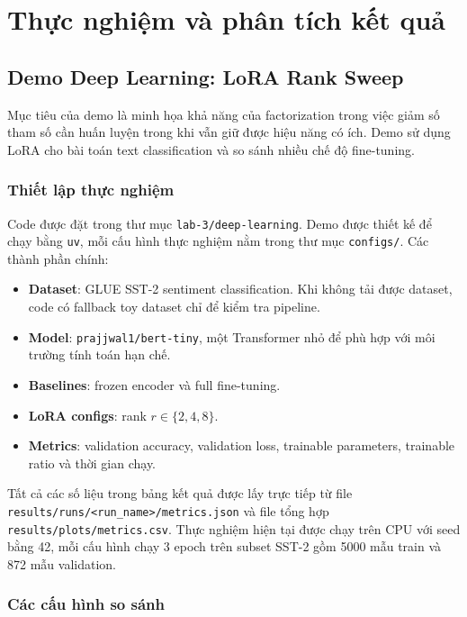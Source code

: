 \section{Thực nghiệm và phân tích kết quả}

\subsection{Demo Deep Learning: LoRA Rank Sweep}

Mục tiêu của demo là minh họa khả năng của factorization trong việc giảm số tham
số cần huấn luyện trong khi vẫn giữ được hiệu năng có ích. Demo sử dụng LoRA cho
bài toán text classification và so sánh nhiều chế độ fine-tuning.

\subsubsection{Thiết lập thực nghiệm}

Code được đặt trong thư mục
\texttt{lab-3/deep-learning}. Demo được thiết kế để chạy bằng \texttt{uv}, mỗi
cấu hình thực nghiệm nằm trong thư mục \texttt{configs/}. Các thành phần chính:

\begin{itemize}
    \item \textbf{Dataset}: GLUE SST-2 sentiment classification. Khi không tải
    được dataset, code có fallback toy dataset chỉ để kiểm tra pipeline.
    \item \textbf{Model}: \texttt{prajjwal1/bert-tiny}, một Transformer nhỏ để
    phù hợp với môi trường tính toán hạn chế.
    \item \textbf{Baselines}: frozen encoder và full fine-tuning.
    \item \textbf{LoRA configs}: rank $r \in \{2,4,8\}$.
    \item \textbf{Metrics}: validation accuracy, validation loss, trainable
    parameters, trainable ratio và thời gian chạy.
\end{itemize}

Tất cả các số liệu trong bảng kết quả được lấy trực tiếp từ file
\texttt{results/runs/<run\_name>/metrics.json} và file tổng hợp
\texttt{results/plots/metrics.csv}. Thực nghiệm hiện tại được chạy trên CPU
với seed bằng 42, mỗi cấu hình chạy 3 epoch trên subset SST-2 gồm 5000 mẫu
train và 872 mẫu validation.

\subsubsection{Các cấu hình so sánh}

